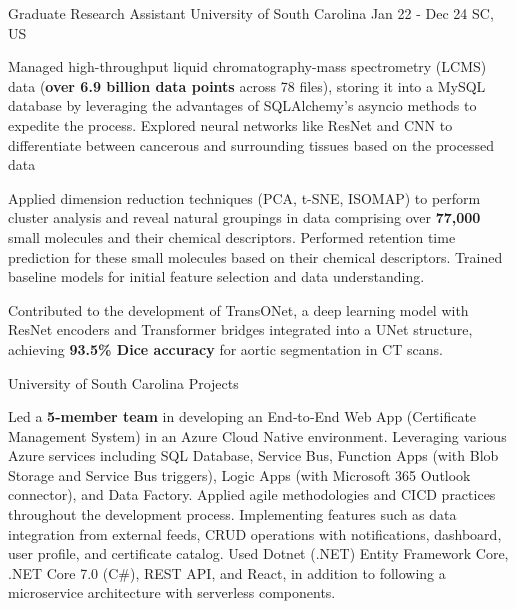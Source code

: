 \begin{cventries}
{\begin{cvitemsfree}
            \end{cvitemsfree}
        }
    \cventry
        {Graduate Research Assistant} %
        {University of South Carolina} %
        {Jan 22 - Dec 24}
        {SC, US} %
        {
            \begin{cvitemsfree} %
                \item{Managed high-throughput liquid chromatography-mass spectrometry (LCMS) data (\textbf{over 6.9 billion data points} across 78 files), storing it into a MySQL database by leveraging the advantages of SQLAlchemy's asyncio methods to expedite the process. Explored neural networks like ResNet and CNN to differentiate between cancerous and surrounding tissues based on the processed data}
                \item{Applied dimension reduction techniques (PCA, t-SNE, ISOMAP) to perform cluster analysis and reveal natural groupings in data comprising over \textbf{77,000} small molecules and their chemical descriptors. Performed retention time prediction for these small molecules based on their chemical descriptors. Trained baseline models for initial feature selection and data understanding.}
                \item{Contributed to the development of TransONet, a deep learning model with ResNet encoders and Transformer bridges integrated into a UNet structure, achieving \textbf{93.5\% Dice accuracy} for aortic segmentation in CT scans.}
            \end{cvitemsfree}
        }
    \cventry
    {University of South Carolina} %
    {Projects} %
    {} %
    {} %
    {
        \begin{cvitemsfree} %
            \item{Led a \textbf{5-member team} in developing an End‑to‑End Web App (Certificate Management System) in an Azure Cloud Native environment. Leveraging various Azure services including SQL Database, Service Bus, Function Apps (with Blob Storage and Service Bus triggers), Logic Apps (with Microsoft 365 Outlook connector), and Data Factory. Applied agile methodologies and CI\/CD practices throughout the development process. Implementing features such as data integration from external feeds, CRUD operations with notifications, dashboard, user profile, and certificate catalog. Used Dotnet (.NET) Entity Framework Core, .NET Core 7.0 (C\#), REST API, and React, in addition to following a microservice architecture with serverless components.}

\end{cvitemsfree}}
\end{cventries}

